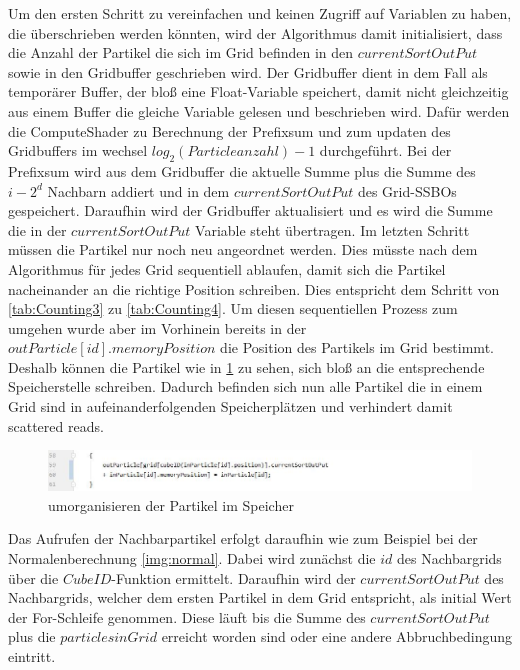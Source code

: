 \documentclass[intern,palatino]{cgBA}
\begin{document}
Um den ersten Schritt zu vereinfachen und keinen Zugriff auf Variablen zu haben, die überschrieben werden könnten, wird der Algorithmus damit initialisiert, dass die Anzahl der Partikel die sich im Grid befinden in den $currentSortOutPut$ sowie in den Gridbuffer geschrieben wird.
\newline
Der Gridbuffer dient in dem Fall als temporärer Buffer, der bloß eine Float-Variable speichert, damit nicht gleichzeitig aus einem Buffer die gleiche Variable gelesen und beschrieben wird.
Dafür werden die ComputeShader zu Berechnung der Prefixsum und zum updaten des Gridbuffers im wechsel $log_2(Particleanzahl)-1$ durchgeführt. Bei der Prefixsum wird aus dem Gridbuffer die aktuelle Summe plus die Summe des $i - 2^d$ Nachbarn addiert und in dem $currentSortOutPut$ des Grid-SSBOs gespeichert. Daraufhin wird der Gridbuffer aktualisiert und es wird die Summe die in der $currentSortOutPut$ Variable steht übertragen.
\newline
Im letzten Schritt müssen die Partikel nur noch neu angeordnet werden. Dies müsste nach dem Algorithmus für jedes Grid sequentiell ablaufen, damit sich die Partikel nacheinander an die richtige Position schreiben. Dies entspricht dem Schritt von \ref{tab:Counting3} zu \ref{tab:Counting4}.
\newline
Um diesen sequentiellen Prozess zum umgehen wurde aber im Vorhinein bereits in der $outParticle[id].memoryPosition$ die Position des Partikels im Grid bestimmt. Deshalb können die Partikel wie in \ref{img:rearrange} zu sehen, sich bloß an die entsprechende Speicherstelle schreiben. Dadurch befinden sich nun alle Partikel die in einem Grid sind in aufeinanderfolgenden Speicherplätzen und verhindert damit scattered reads.

\begin{figure}[H]
	\centering
	\includegraphics[width=1.3\columnwidth]{Bilder/rearrange.jpg}
	\caption{umorganisieren der Partikel im Speicher}
	\label{img:rearrange}
\end{figure}

Das Aufrufen der Nachbarpartikel erfolgt daraufhin wie zum Beispiel bei der Normalenberechnung \ref{img:normal}. Dabei wird zunächst die $id$ des Nachbargrids über die $CubeID$-Funktion ermittelt. Daraufhin wird der $currentSortOutPut$ des Nachbargrids, welcher dem ersten Partikel in dem Grid entspricht, als initial Wert der For-Schleife genommen. Diese läuft bis die Summe des $currentSortOutPut$ plus die $particlesinGrid$ erreicht worden sind oder eine andere Abbruchbedingung eintritt.
\end{document}
